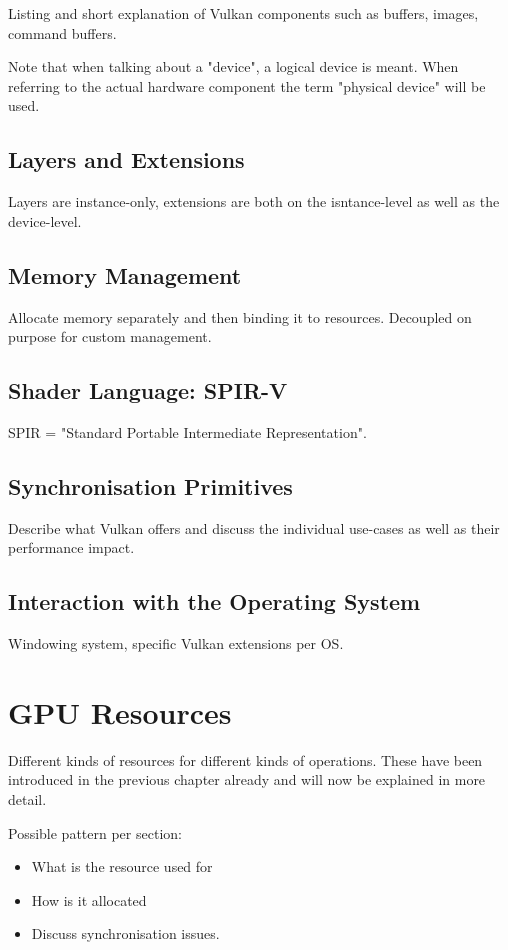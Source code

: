 \documentclass[draft,12pt]{report}
\begin{document}
    Listing and short explanation of Vulkan components such as buffers, images, command buffers.

    Note that when talking about a "device", a logical device is meant. When referring to the actual hardware component the term "physical device" will be used.

    \section{Layers and Extensions}
      Layers are instance-only, extensions are both on the isntance-level as well as the device-level.

    \section{Memory Management}
      Allocate memory separately and then binding it to resources. Decoupled on purpose for custom management.

    \section{Shader Language: SPIR-V}
      SPIR = "Standard Portable Intermediate Representation".

    \section{Synchronisation Primitives}
      Describe what Vulkan offers and discuss the individual use-cases as well as their performance impact.

    \section{Interaction with the Operating System}
      Windowing system, specific Vulkan extensions per OS.


  \chapter{GPU Resources}
    Different kinds of resources for different kinds of operations. These have been introduced in the previous chapter already and will now be explained in more detail.

    Possible pattern per section:
    \begin{itemize}
      \item What is the resource used for
      \item How is it allocated
      \item Discuss synchronisation issues.
    \end{itemize}
\end{document}
